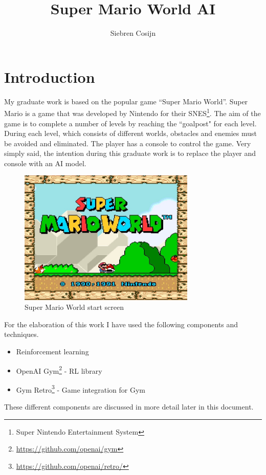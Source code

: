 \documentclass{article}
\title{Super Mario World AI}
\author{Siebren Cosijn}
\date{\displaydate{date}}
\begin{document}
    \maketitle

    \section{Introduction}
    My graduate work is based on the popular game ``Super Mario World''.
    Super Mario is a game that was developed by Nintendo for their SNES\footnote{Super Nintendo Entertainment System}.
    The aim of the game is to complete a number of levels by reaching the “goalpost" for each level.
    During each level, which consists of different worlds, obstacles and enemies must be avoided and eliminated.
    The player has a console to control the game.
    Very simply said, the intention during this graduate work is to replace the player and console with an AI model.

    \begin{figure}[ht]
        \centering
        \includegraphics[width=0.75\textwidth]{start-screen}
        \caption{Super Mario World start screen}
        \label{fig:smw}
    \end{figure}

    For the elaboration of this work I have used the following components and techniques.
    \begin{itemize}
        \item Reinforcement learning
        \item OpenAI Gym\footnote{\url{https://github.com/openai/gym}} \cite{brockman2016openai} - RL library
        \item Gym Retro\footnote{\url{https://github.com/openai/retro/}} - Game integration for Gym
    \end{itemize}
    These different components are discussed in more detail later in this document.
\end{document}
